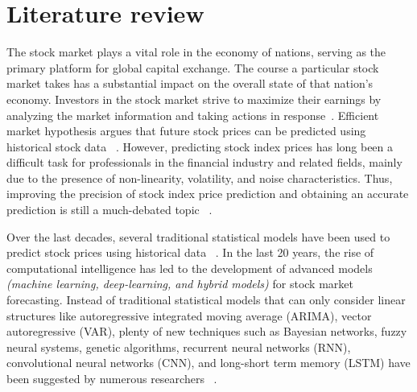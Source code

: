 \section{Literature review}
\label{sec:litreview}
%
The stock market plays a vital role in the economy of nations, serving as the
primary platform for global capital exchange. The course a particular stock
market takes has a substantial impact on the overall state of that nation's
economy. Investors in the stock market strive to maximize their earnings by
analyzing the market information and taking actions in
response~\citep{gao2020application}. Efficient market
hypothesis argues that future stock prices can be predicted using
historical stock data ~\citep{fama1970efficient, shahi2020stock}. However,
predicting stock index prices has long been a difficult task for professionals
in the financial industry and related fields, mainly due to the presence of
non-linearity, volatility, and noise characteristics. Thus, improving the
precision of stock index price prediction and obtaining an accurate prediction
is still a much-debated topic ~\citep{binkowski2018autoregressive}. 

Over the
last decades, several traditional statistical models have been used to predict
stock prices using historical data ~\citep{jarrett2011arima,
tsai2012relationship, mensi2014global, sahoo2015stock, cakra2015stock,
suharsono2017comparison, ma2018investor, izzeldin2019forecasting,
tulcanaza2019determinants,
ning2019stock}. 
In the last 20 years, the rise of computational intelligence has led to the
development of advanced models \textit{(machine learning, deep-learning, and
hybrid models)} for stock market forecasting. Instead of traditional statistical
models that can only consider linear structures like autoregressive integrated
moving average (ARIMA), vector autoregressive (VAR), plenty of new techniques
such as Bayesian networks, fuzzy neural systems, genetic algorithms, recurrent
neural networks (RNN), convolutional neural networks (CNN), and long-short term
memory (LSTM) have been suggested by numerous researchers
~\citep{cheng2010hybrid, karazmodeh2013stock, chen2015hybrid, chong2017deep,
hiransha2018nse, cao2020multiobjective, nikou2019stock, hargreaves2020stock,
shahi2020stock, setiani2021prediction, pahlawan2021stock, alkhatib2022new,
nasiri2023multi}. 

